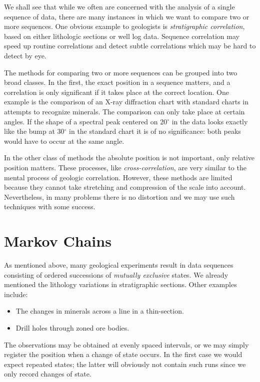 	We shall see that while we often are concerned with the analysis of a single sequence of data, there 
are many instances in which we want to compare two or more sequences.  One obvious example 
to geologists is \emph{stratigraphic correlation}, based on either lithologic sections or well log data.  Sequence 
correlation may speed up routine correlations and detect subtle correlations which may be hard to 
detect by eye.

The methods for comparing two or more sequences can be grouped into two 
broad classes.
In the first, the exact position in a sequence matters, and a correlation is only 
significant if it takes place at the correct location.  One example is the comparison of an X-ray 
diffraction chart with standard charts in attempts to recognize minerals.  The comparison can 
only take place at certain angles.  If the shape of a spectral peak centered on 20$^\circ$ in the data looks 
exactly like the bump at 30$^\circ$ in the standard chart it is of no significance: both peaks would have 
to occur at the same angle.

     In the other class of methods the absolute position is not important, only relative position 
matters.  These processes, like \emph{cross-correlation}, are very similar to the mental process of 
geologic correlation.  However, these methods are limited because they cannot take stretching 
and compression of the scale into account.  Nevertheless, in many problems there is no distortion and we may 
use such techniques with some success.

\section{Markov Chains}

As mentioned above, many geological experiments result in data sequences consisting of 
ordered successions of \emph{mutually exclusive} states.  We already mentioned the lithology variations 
in stratigraphic sections.  Other examples include:
\begin{itemize}
\item	The changes in minerals across a line in a thin-section.
\item	Drill holes through zoned ore bodies.
\end{itemize}
The observations may be obtained at evenly spaced intervals, or we may simply register the 
position when a change of state occurs.  In the first case we would expect repeated states; the 
latter will obviously not contain such runs since we only record changes of state. 

